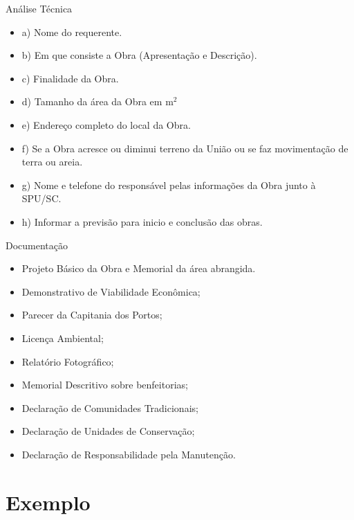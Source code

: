 \documentclass[9pt,ignorenonframetext,]{beamer}
\begin{document}
\begin{frame}{Análise Técnica}

\begin{itemize}[<+- | alert@+>]
  \item a) Nome do requerente.
  \item b) Em que consiste a Obra (Apresentação e Descrição).
  \item c) Finalidade da Obra.
  \item d) Tamanho da área da Obra em $\mathrm{m}^2$
  \item e) Endereço completo do local da Obra. 
  \item f) Se a Obra acresce ou diminui terreno da União ou se faz movimentação de terra ou areia.
  \item g) Nome e telefone do responsável pelas informações da Obra junto à SPU/SC. 
  \item h) Informar a previsão para inicio e conclusão das obras.
\end{itemize}

\end{frame}

\begin{frame}{Documentação}
\protect\hypertarget{documentauxe7uxe3o}{}

\begin{itemize}[<+- | alert@+>]
  \item Projeto Básico da Obra e Memorial da área abrangida.
  \item Demonstrativo de Viabilidade Econômica;
  \item Parecer da Capitania dos Portos;
  \item Licença Ambiental;
  \item Relatório Fotográfico;
  \item Memorial Descritivo sobre benfeitorias;
  \item Declaração de Comunidades Tradicionais;
  \item Declaração de Unidades de Conservação;
  \item Declaração de Responsabilidade pela Manutenção.
\end{itemize}

\end{frame}

\hypertarget{exemplo}{%
\section{Exemplo}\label{exemplo}}
\end{document}
